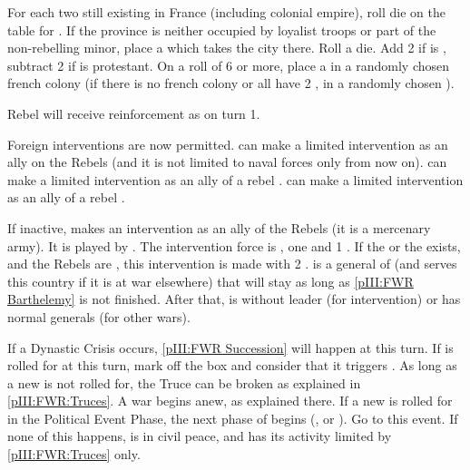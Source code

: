 \begin{digressions}
  \phevnt
  \bparag For each two \REVOLT still existing in France (including colonial
  empire), roll die on the \REVOLT table for \FRA. If the province is neither
  occupied by loyalist troops or part of the non-rebelling minor, place a
  \REVOLT \facemoins which takes the city there.
  \bparag Roll a die. Add 2 if \FRA is \CATHCR, subtract 2 if \FRA is
  protestant. On a roll of 6 or more, place a \REVOLT \facemoins in a randomly
  chosen french colony (if there is no french colony or all have 2 \REVOLT
  \faceplus, in a randomly chosen \TP).

  \phadm
  \aparag Rebel will receive reinforcement as on turn 1.

  \phdipl
  \aparag Foreign interventions are now permitted.
  \aparag \REB can make a limited intervention as an ally on the Rebels (and
  it is not limited to naval forces only from now on).
  \aparag \HOL can make a limited intervention as an ally of a rebel \hug.
  \aparag \SPA can make a limited intervention as an ally of a rebel \lig.

  \phmil
  \label{pIII:FWR:Palatinate} If
  inactive, \paysPalatinat makes an intervention as an ally of the Rebels (it
  is a mercenary army). It is played by \REB. The intervention force is
  , one \ARMY \faceplus and 1 \DT.  If the
   or the 
  exists, and the Rebels are \hug, this intervention is made with 2 \ARMY
  \faceplus.   is a general of \paysPalatinat (and serves
  this country if it is at war elsewhere) that will stay as long as
  \ref{pIII:FWR Barthelemy} is not finished.  After that, \paysPalatinat is
  without leader (for intervention) or has normal generals (for other wars).




  \phevnt
  \aparag If a Dynastic Crisis occurs, \ref{pIII:FWR Succession} will happen
  at this turn. If  is rolled for at this turn, mark off
  the box and consider that it triggers .
  \aparag As long as a new  is not rolled for, the Truce
  can be broken as explained in \ref{pIII:FWR:Truces}. A war begins anew, as
  explained there.
  \aparag If a new  is rolled for in the Political Event
  Phase, the next phase of  begins (,  or ). Go to this event.
  \aparag If none of this happens, \FRA is in civil peace, and has its
  activity limited by \ref{pIII:FWR:Truces} only.


\end{digressions}
